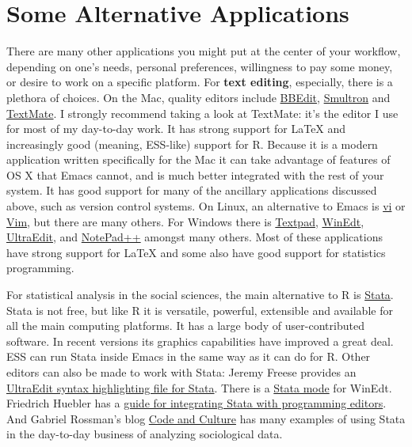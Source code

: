 \documentclass[11pt,article,oneside]{memoir}
\begin{document}
\section{Some Alternative Applications}
There are many other applications you might put at the center of your workflow, depending on one's needs, personal preferences, willingness to pay some money, or desire to work on a specific platform. For \textbf{text editing}, especially, there is a plethora of choices. On the Mac, quality editors  include
\href{http://www.barebones.com/products/bbedit/index.shtml}{BBEdit}, \href{http://smultron.sourceforge.net/}{Smultron} and \href{http://macromates.com/}{TextMate}. I strongly recommend taking a look at TextMate: it's the editor I use for most of my day-to-day work. It has strong support for LaTeX and increasingly good (meaning, ESS-like) support for R. Because it is a modern application written specifically for the Mac it can take advantage of features of OS X that Emacs cannot, and is much better integrated with the rest of your system. It has good support for many of the ancillary applications discussed above, such as version control systems. On Linux, an alternative to Emacs is \href{http://www.eng.hawaii.edu/Tutor/vi.html}{vi} or \href{http://www.vim.org/}{Vim}, but there are many others. For Windows there is \href{http://www.textpad.com/}{Textpad}, \href{http://www.winedt.com/}{WinEdt}, \href{http://www.ultraedit.com/}{UltraEdit}, and \href{http://notepad-plus.sourceforge.net/uk/site.htm}{NotePad++} amongst many others. Most of these applications have strong support for LaTeX and some also have good support for statistics programming.

For statistical analysis in the social sciences, the main alternative to R is \href{http://www.stata.com/}{Stata}. Stata is not free, but like R it is versatile, powerful, extensible and available for all the main computing platforms. It has a large body of user-contributed software. In recent versions its graphics capabilities have improved a great deal. ESS can run Stata inside Emacs in the same way as it can do for R. Other editors can also be made to work with Stata: Jeremy Freese provides an  \href{http://www.jeremyfreese.com/#other%20research}{UltraEdit syntax highlighting file for Stata}.  There is a \href{http://www.winedt.org/Config/modes/Stata.php}{Stata mode} for WinEdt. Friedrich Huebler has a \href{http://mysite.verizon.net/huebler/2005/20050310_Stata_editor.html}{guide for integrating Stata with programming editors}. And Gabriel Rossman's blog \href{http://codeandculture.wordpress.com/tag/stata/}{Code and Culture} has many examples of using Stata in the day-to-day business of analyzing sociological data.    
\end{document}
